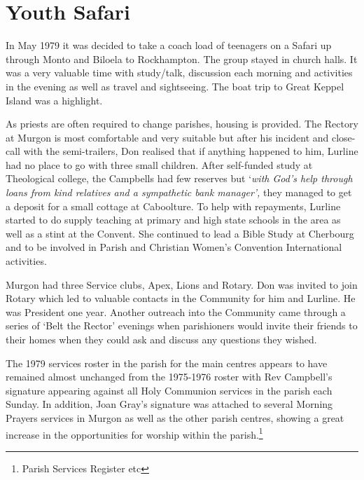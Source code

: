 \section{Youth Safari}

In May 1979 it was decided to take a coach load of teenagers on a Safari
up through Monto and Biloela to Rockhampton. The group stayed in church
halls. It was a very valuable time with study/talk, discussion each
morning and activities in the evening as well as travel and sightseeing.
The boat trip to Great Keppel Island was a highlight.

As priests are often required to change parishes, housing is provided.
The Rectory at Murgon is most comfortable and very suitable but after
his incident and close-call with the semi-trailers, Don realised that if
anything happened to him, Lurline had no place to go with three small
children. After self-funded study at Theological college, the Campbells
had few reserves but `\emph{with God's help through loans from kind
relatives and a sympathetic bank manager',} they managed to get a
deposit for a small cottage at Caboolture. To help with repayments,
Lurline started to do supply teaching at primary and high state schools
in the area as well as a stint at the Convent. She continued to lead a
Bible Study at Cherbourg and to be involved in Parish and Christian
Women's Convention International activities.

Murgon had three Service clubs, Apex, Lions and Rotary. Don was invited
to join Rotary which led to valuable contacts in the Community for him
and Lurline. He was President one year. Another outreach into the
Community came through a series of `Belt the Rector' evenings when
parishioners would invite their friends to their homes when they could
ask and discuss any questions they wished.

The 1979 services roster in the parish for the main centres appears to
have remained almost unchanged from the 1975-1976 roster with Rev
Campbell's signature appearing against all Holy Communion services in
the parish each Sunday. In addition, Joan Gray's signature was attached
to several Morning Prayers services in Murgon as well as the other
parish centres, showing a great increase in the opportunities for
worship within the parish.\footnote{Parish Services Register etc}

